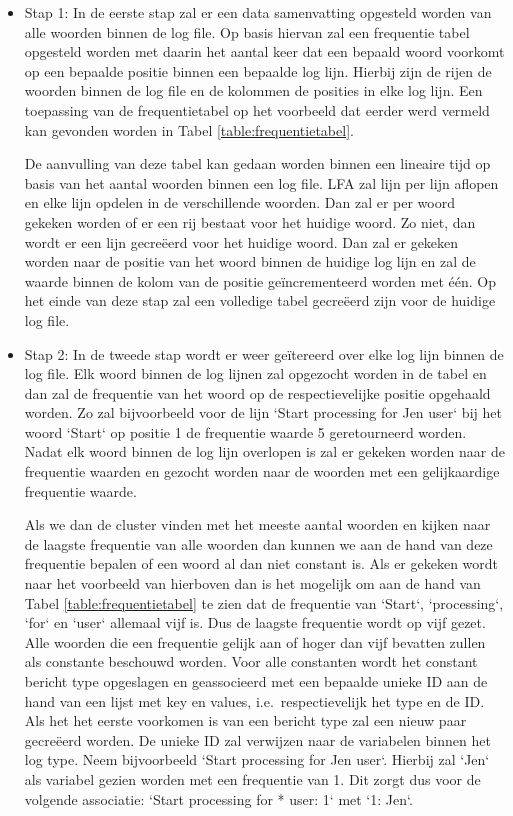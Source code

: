 \begin{itemize}
    \item Stap 1: In de eerste stap zal er een data samenvatting opgesteld worden van alle woorden binnen de log file. Op basis hiervan zal een frequentie tabel opgesteld worden met daarin het aantal keer dat een bepaald woord voorkomt op een bepaalde positie binnen een bepaalde log lijn. Hierbij zijn de rijen de woorden binnen de log file en de kolommen de posities in elke log lijn. Een toepassing van de frequentietabel op het voorbeeld dat eerder werd vermeld kan gevonden worden in Tabel \ref{table:frequentietabel}. 
    
    De aanvulling van deze tabel kan gedaan worden binnen een lineaire tijd op basis van het aantal woorden binnen een log file. LFA zal lijn per lijn aflopen en elke lijn opdelen in de verschillende woorden. Dan zal er per woord gekeken worden of er een rij bestaat voor het huidige woord. Zo niet, dan wordt er een lijn gecreëerd voor het huidige woord. Dan zal er gekeken worden naar de positie van het woord binnen de huidige log lijn en zal de waarde binnen de kolom van de positie geïncrementeerd worden met één. Op het einde van deze stap zal een volledige tabel gecreëerd zijn voor de huidige log file.\\
    
    \item Stap 2: In de tweede stap wordt er weer geïtereerd over elke log lijn binnen de log file. Elk woord binnen de log lijnen zal opgezocht worden in de tabel en dan zal de frequentie van het woord op de respectievelijke positie opgehaald worden. Zo zal bijvoorbeeld voor de lijn `Start processing for Jen user` bij het woord `Start` op positie 1 de frequentie waarde 5 geretourneerd worden. Nadat elk woord binnen de log lijn overlopen is zal er gekeken worden naar de frequentie waarden en gezocht worden naar de woorden met een gelijkaardige frequentie waarde. 
    
    Als we dan de cluster vinden met het meeste aantal woorden en kijken naar de laagste frequentie van alle woorden dan kunnen we aan de hand van deze frequentie bepalen of een woord al dan niet constant is. Als er gekeken wordt naar het voorbeeld van hierboven dan is het mogelijk om aan de hand van Tabel \ref{table:frequentietabel} te zien dat de frequentie van `Start`, `processing`, `for` en `user` allemaal vijf is. Dus de laagste frequentie wordt op vijf gezet. Alle woorden die een frequentie gelijk aan of hoger dan vijf bevatten zullen als constante beschouwd worden. Voor alle constanten wordt het constant bericht type opgeslagen en geassocieerd met een bepaalde unieke ID aan de hand van een lijst met key en values, i.e.\ respectievelijk het type en de ID. Als het het eerste voorkomen is van een bericht type zal een nieuw paar gecreëerd worden. De unieke ID zal verwijzen naar de variabelen binnen het log type. Neem bijvoorbeeld `Start processing for Jen user`. Hierbij zal `Jen` als variabel gezien worden met een frequentie van 1. Dit zorgt dus voor de volgende associatie: `Start processing for * user: 1` met `1: Jen`.
\end{itemize}

